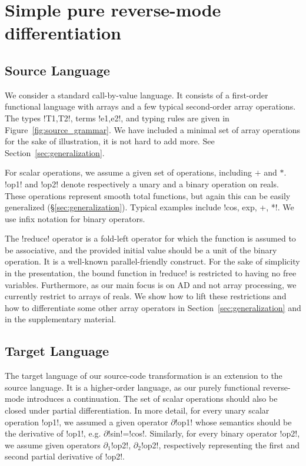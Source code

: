 \section{Simple pure reverse-mode differentiation}
\label{sec:simplediff}

\subsection{Source Language}
\label{sub:sourcelang}

We consider a standard call-by-value language. 
It consists of a first-order functional language with arrays and a few typical second-order array operations. 
The types !T1,T2!, terms !e1,e2!, and typing rules are given in Figure~\ref{fig:source_grammar}.
We have included a minimal set of array operations for the sake of illustration,  it is not hard to add more.
See Section~\ref{sec:generalization}.



For scalar operations, we assume a given set of operations, including $+$ and $*$. 
!op1! and !op2! denote respectively a unary and a binary operation on reals. 
These operations represent smooth total functions, 
but again this can be easily generalized (\S\ref{sec:generalization}).  
Typical examples include !cos, exp, +, *!. 
We use infix notation for binary operators.

The !reduce! operator is a fold-left operator for which the function is assumed to be associative, 
and the provided initial value should be a unit of the binary operation.
It is a well-known parallel-friendly construct. 
For the sake of simplicity in the presentation, the bound function in !reduce! 
is restricted to having no free variables. Furthermore, as our main focus is on AD and not array processing,
we currently restrict to arrays of reals.
We show how to lift these restrictions and how to differentiate some other array operators in Section~\ref{sec:generalization} 
and in the supplementary material.

\subsection{Target Language}

The target language of our source-code transformation is an extension to the source language.
It is a higher-order language, as our purely functional reverse-mode introduces a continuation.
The set of scalar operations should also be closed under partial differentiation. 
In more detail, for every unary scalar operation !op1!, 
we assumed a given operator $\partial$!op1! whose semantics should be the derivative of !op1!, e.g. $\partial$!sin!=!cos!.
Similarly, for every binary operator !op2!, we assume given operators $\partial_1$!op2!, $\partial_2$!op2!, 
respectively representing the first and second partial derivative of !op2!.

